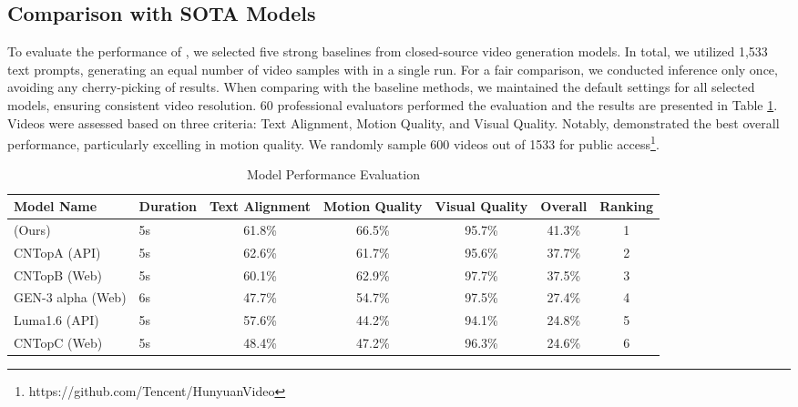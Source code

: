 \subsection{Comparison with SOTA Models}
To evaluate the performance of \nameofmethod{}, we selected five strong baselines from closed-source video generation models. In total, we utilized 1,533 text prompts, generating an equal number of video samples with \nameofmethod{} in a single run. For a fair comparison, we conducted inference only once, avoiding any cherry-picking of results. When comparing with the baseline methods, we maintained the default settings for all selected models, ensuring consistent video resolution. 60 professional evaluators performed the evaluation and the results are presented in Table \ref{tab:compare}. Videos were assessed based on three criteria: Text Alignment, Motion Quality, and Visual Quality. Notably, \nameofmethod{} demonstrated the best overall performance, particularly excelling in motion quality. We randomly sample 600 videos out of 1533 for public access\footnote{https://github.com/Tencent/HunyuanVideo}.
\begin{table}[h]
    \centering
    \footnotesize
    \caption{Model Performance Evaluation}
    \begin{tabular}{@{}llccccc@{}}
        \toprule
        Model Name                             &  Duration & Text Alignment  & Motion Quality  & Visual Quality  & Overall  & Ranking \\ \midrule
        \nameofmethod{} (Ours)               & 5s       & 61.8\%               & 66.5\%          & 95.7\%          & 41.3\%      & 1              \\
        CNTopA (API)       & 5s       & 62.6\%               & 61.7\%          & 95.6\%          & 37.7\%      & 2              \\
        CNTopB (Web)          & 5s       & 60.1\%               & 62.9\%          & 97.7\%          & 37.5\%      & 3              \\
        GEN-3 alpha (Web)           & 6s       & 47.7\%               & 54.7\%          & 97.5\%          & 27.4\%      & 4              \\
        Luma1.6 (API)                & 5s       & 57.6\%               & 44.2\%          & 94.1\%          & 24.8\%      & 5              \\
        CNTopC (Web)        & 5s       & 48.4\%               & 47.2\%          & 96.3\%          & 24.6\%      & 6              \\
         \bottomrule
    \end{tabular}
    \label{tab:compare}

\end{table}



